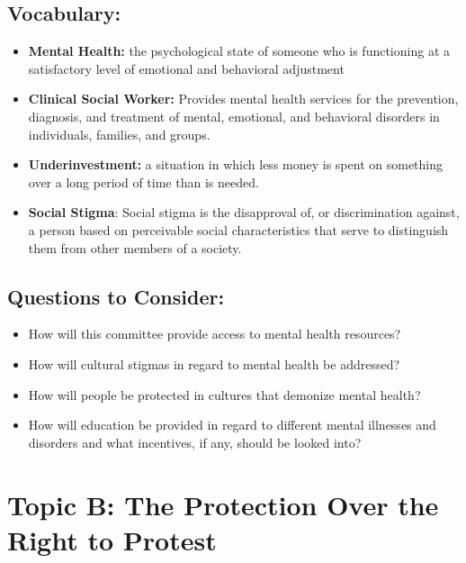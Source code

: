 \documentclass[10pt, letterpaper]{article}
\begin{document}
\subsection{Vocabulary:}
\begin{itemize}
\item     
\textbf{Mental Health:} the psychological state of someone who is
functioning at a satisfactory level of emotional and behavioral
adjustment
\item 
\textbf{Clinical Social Worker:} Provides mental health services for the
prevention, diagnosis, and treatment of mental, emotional, and
behavioral disorders in individuals, families, and groups.
\item 
\textbf{Underinvestment:} a situation in which less money is spent on
something over a long period of time than is needed.
\item 
\textbf{Social Stigma}: Social stigma is the disapproval of, or
discrimination against, a person based on perceivable social
characteristics that serve to distinguish them from other members of a
society.
\end{itemize}

\subsection{Questions to Consider:}

\begin{itemize}
\item
  
  How will this committee provide access to mental health resources?
  
\item
  
  How will cultural stigmas in regard to mental health be addressed?
  
\item
  
  How will people be protected in cultures that demonize mental health?
  
\item
  
  How will education be provided in regard to different mental illnesses
  and disorders and what incentives, if any, should be looked into?
  
\end{itemize}

\newpage
\section{{Topic B: The Protection Over the Right to Protest}}
\end{document}
